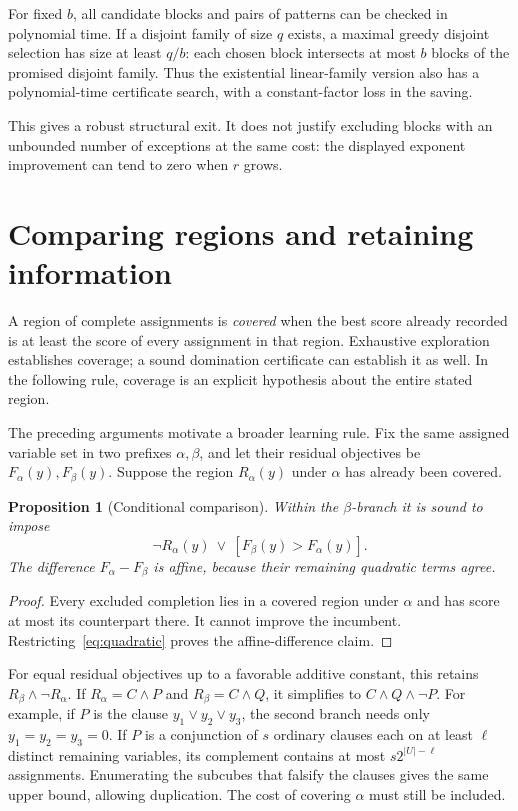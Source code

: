 \documentclass[11pt,a4paper]{article}
\newtheorem{proposition}[theorem]{Proposition}
\theoremstyle{definition}
\theoremstyle{remark}
\begin{document}
For fixed $b$, all candidate blocks and pairs of patterns can be checked
in polynomial time. If a disjoint family of size $q$ exists, a maximal
greedy disjoint selection has size at least $q/b$: each chosen block
intersects at most $b$ blocks of the promised disjoint family. Thus the
existential linear-family version also has a polynomial-time certificate
search, with a constant-factor loss in the saving.

This gives a robust structural exit. It does not justify excluding blocks
with an unbounded number of exceptions at the same cost: the displayed
exponent improvement can tend to zero when $r$ grows.

\section{Comparing regions and retaining information}\label{sec:cache}

A region of complete assignments is \emph{covered} when the best score
already recorded is at least the score of every assignment in that region.
Exhaustive exploration establishes coverage; a sound domination certificate
can establish it as well. In the following rule, coverage is an explicit
hypothesis about the entire stated region.

The preceding arguments motivate a broader learning rule. Fix the same
assigned variable set in two prefixes $\alpha,\beta$, and let their residual
objectives be $F_\alpha(y),F_\beta(y)$. Suppose the region $R_\alpha(y)$
under $\alpha$ has already been covered.

\begin{proposition}[Conditional comparison]\label{prop:conditional}
Within the $\beta$-branch it is sound to impose
\begin{equation}
 \neg R_\alpha(y)\ \vee\ [F_\beta(y)>F_\alpha(y)].
                                                        \label{eq:conditional}
\end{equation}
The difference $F_\alpha-F_\beta$ is affine, because their remaining
quadratic terms agree.
\end{proposition}
\begin{proof}
Every excluded completion lies in a covered region under $\alpha$ and has
score at most its counterpart there. It cannot improve the incumbent.
Restricting~\eqref{eq:quadratic} proves the affine-difference claim.
\end{proof}

For equal residual objectives up to a favorable additive constant, this
retains $R_\beta\wedge\neg R_\alpha$. If
$R_\alpha=C\wedge P$ and $R_\beta=C\wedge Q$, it simplifies to
$C\wedge Q\wedge\neg P$. For example, if $P$ is the clause
$y_1\vee y_2\vee y_3$, the second branch needs only $y_1=y_2=y_3=0$.
If $P$ is a conjunction of $s$ ordinary clauses each on at least $\ell$
distinct remaining variables, its complement contains at most
$s2^{|U|-\ell}$ assignments. Enumerating the subcubes that falsify the
clauses gives the same upper bound, allowing duplication. The cost of
covering $\alpha$ must still be included.
\end{document}

